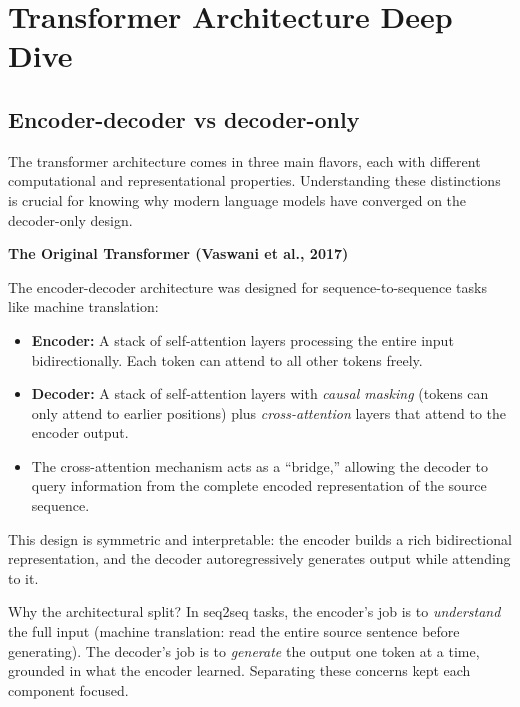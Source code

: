 
\section{Transformer Architecture Deep Dive}

\subsection{Encoder-decoder vs decoder-only}

The transformer architecture comes in three main flavors, each with different computational and representational properties. Understanding these distinctions is crucial for knowing why modern language models have converged on the decoder-only design.

\begin{notebox}
\textbf{The Original Transformer (Vaswani et al., 2017)}

The encoder-decoder architecture was designed for sequence-to-sequence tasks like machine translation:
\begin{itemize}
  \item \textbf{Encoder:} A stack of self-attention layers processing the entire input bidirectionally. Each token can attend to all other tokens freely.
  \item \textbf{Decoder:} A stack of self-attention layers with \textit{causal masking} (tokens can only attend to earlier positions) plus \textit{cross-attention} layers that attend to the encoder output.
  \item The cross-attention mechanism acts as a ``bridge,'' allowing the decoder to query information from the complete encoded representation of the source sequence.
\end{itemize}
This design is symmetric and interpretable: the encoder builds a rich bidirectional representation, and the decoder autoregressively generates output while attending to it.
\end{notebox}

\begin{intuitionbox}
Why the architectural split? In seq2seq tasks, the encoder's job is to \textit{understand} the full input (machine translation: read the entire source sentence before generating). The decoder's job is to \textit{generate} the output one token at a time, grounded in what the encoder learned. Separating these concerns kept each component focused.
\end{intuitionbox}

